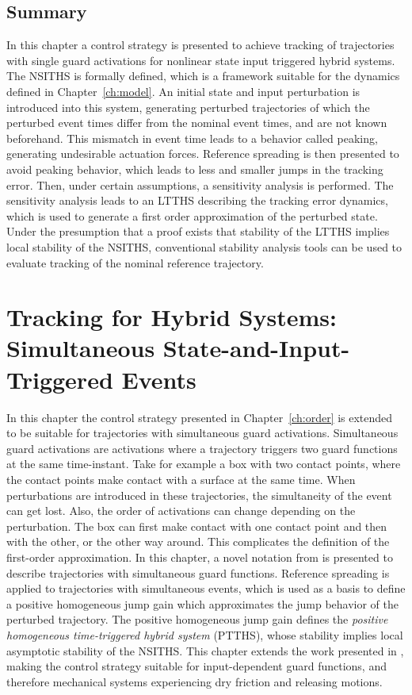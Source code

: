 \documentclass[../DC2017114Bouma.tex]{subfiles}
\begin{document}
\section{Summary}
In this chapter a control strategy is presented to achieve tracking of trajectories with single guard activations for nonlinear state input triggered hybrid systems. The NSITHS is formally defined, which is a framework suitable for the dynamics defined in Chapter~\ref{ch:model}. An initial state and input perturbation is introduced into this system, generating perturbed trajectories of which the perturbed event times differ from the nominal event times, and are not known beforehand. This mismatch in event time leads to a behavior called peaking, generating undesirable actuation forces. Reference spreading is then presented to avoid peaking behavior, which leads to less and smaller jumps in the tracking error. Then, under certain assumptions, a sensitivity analysis is performed. The sensitivity analysis leads to an LTTHS describing the tracking error dynamics, which is used to generate a first order approximation of the perturbed state. Under the presumption that a proof exists that stability of the LTTHS implies local stability of the NSITHS, conventional stability analysis tools can be used to evaluate tracking of the nominal reference trajectory.
\cleartooddpage
\chapter{Tracking for Hybrid Systems: Simultaneous State-and-Input-Triggered Events}\label{ch:simult}
In this chapter the control strategy presented in Chapter~\ref{ch:order} is extended to be suitable for trajectories with simultaneous guard activations. Simultaneous guard activations are activations where a trajectory triggers two guard functions at the same time-instant. Take for example a box with two contact points, where the contact points make contact with a surface at the same time. When perturbations are introduced in these trajectories, the simultaneity of the event can get lost. Also, the order of activations can change depending on the perturbation. The box can first make contact with one contact point and then with the other, or the other way around. This complicates the definition of the first-order approximation. In this chapter, a novel notation from \cite{Rijnen2018} is presented to describe trajectories with simultaneous guard functions. Reference spreading is applied to trajectories with simultaneous events, which is used as a basis to define a positive homogeneous jump gain which approximates the jump behavior of the perturbed trajectory. The positive homogeneous jump gain defines the \textit{positive homogeneous time-triggered hybrid system} (PTTHS), whose stability implies local asymptotic stability of the NSITHS. This chapter extends the work presented in \cite{Rijnen2018}, making the control strategy suitable for input-dependent guard functions, and therefore mechanical systems experiencing dry friction and releasing motions.
\end{document}
